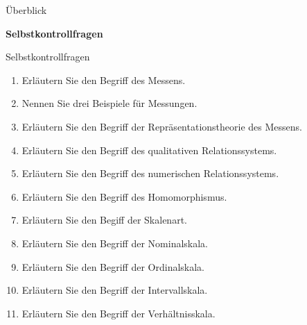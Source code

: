 \documentclass[
  8pt,
  ignorenonframetext,
]{beamer}
\providecommand{\tightlist}{%
  \setlength{\itemsep}{0pt}\setlength{\parskip}{0pt}}
\begin{document}
\begin{frame}{}
\protect\hypertarget{section-4}{}
\Large
{}
\vfill

Überblick

\textbf{Selbstkontrollfragen} \vfill
\end{frame}

\begin{frame}{Selbstkontrollfragen}
\protect\hypertarget{selbstkontrollfragen}{}
\footnotesize

\begin{enumerate}
\tightlist
\item
  Erläutern Sie den Begriff des Messens.
\item
  Nennen Sie drei Beispiele für Messungen.
\item
  Erläutern Sie den Begriff der Repräsentationstheorie des Messens.
\item
  Erläutern Sie den Begriff des qualitativen Relationssystems.
\item
  Erläutern Sie den Begriff des numerischen Relationssystems.
\item
  Erläutern Sie den Begriff des Homomorphismus.
\item
  Erläutern Sie den Begiff der Skalenart.
\item
  Erläutern Sie den Begriff der Nominalskala.
\item
  Erläutern Sie den Begriff der Ordinalskala.
\item
  Erläutern Sie den Begriff der Intervallskala.
\item
  Erläutern Sie den Begriff der Verhältnisskala.
\end{enumerate}
\end{frame}
\end{document}
